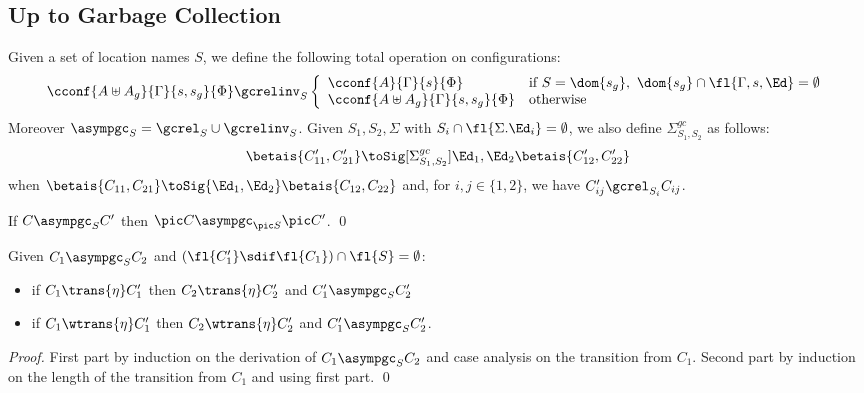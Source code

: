 \subsection{Up to Garbage Collection}


\begin{definition} \label{def:asymp}%
  Given a set of location names $S$,
  we define the following total operation on configurations:
  \[
    \cconf{A\uplus A_g}{\Gamma}{s,s_g}{\Phi}
    \gcrelinv_{S}
    \left\{\begin{array}{ll}
      \cconf{A}{\Gamma}{s}{\Phi}
      & \text{if }
      S=\dom{s_g},~
      \dom{s_g}\cap\fl{\Gamma,s,\Ed}=\emptyset
      \\
      \cconf{A\uplus A_g}{\Gamma}{s,s_g}{\Phi}
      &\text{otherwise}
    \end{array}\right.
  \]
  Moreover ${\asympgc_S}={\gcrel_S} \cup {\gcrelinv_S}$.
%
Given $S_1,S_2,\Sigma$ with $S_i\cap\fl{\Sigma.\Ed_i}=\emptyset$, 
  we also define $\Sigma^{gc}_{S_1,S_2}$ as follows:
  \begin{align*}
    \betais{C'_{11},C'_{21}}\toSig[\Sigma^{gc}_{S_1,S_2}]{\Ed_1,\Ed_2}\betais{C'_{12},C'_{22}}
  \end{align*}
  when
    $\betais{C_{11},C_{21}}\toSig{\Ed_1,\Ed_2}\betais{C_{12},C_{22}}$ and,
      for $i,j\in\{1,2\}$, we have $C_{ij}' \gcrel_{S_i} C_{ij}$.
\end{definition}
\begin{lemma}\label{lem:asymp-perm}%
  If $C \asympgc_{S} C'$ then $\pic C \asympgc_{\pic S} \pic C'$.
  \qed
\end{lemma}
\begin{lemma}\label{lem:asymp-bisim}\label{lem:asymp-bisim-weak}%
  Given $C_1\asympgc_{S} C_2$ and       $(\fl{C_1'}\sdif\fl{C_1})\cap \fl{S} = \emptyset$:
  \begin{itemize}
    \item if
 $C_1 \trans{\eta} C_1'$ then
  $C_{2} \trans{\eta} C_{2}'$ and $C_1' \asympgc_{S} C_2'$ %

\item if $C_1 \wtrans{\eta} C_1'$ then
  $C_2 \wtrans{\eta} C_2'$ and $C_1' \asympgc_{S} C_2'$.
\end{itemize}
\end{lemma}
\begin{proof}
First part by induction on the derivation of $C_1 \asympgc_{S} C_2$ and case analysis on the transition from $C_1$. Second part 
  by induction on the length of the transition from $C_1$ and using first part.
\qed\end{proof}
